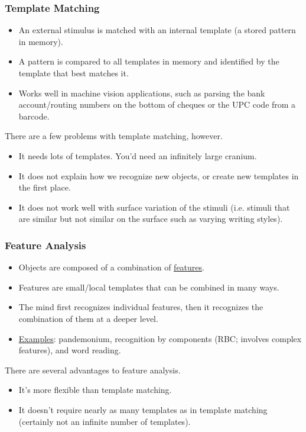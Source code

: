 \documentclass[]{article}
\begin{document}
			\subsubsection{Template Matching}
				\begin{itemize}
					\item An external stimulus is matched with an internal template (a stored pattern in memory).
					\item A pattern is compared to all templates in memory and identified by the template that best matches it.
					\item Works well in machine vision applications, such as parsing the bank account/routing numbers on the bottom of cheques or the UPC code from a barcode.
				\end{itemize}

				There are a few problems with template matching, however.
				\begin{itemize}
					\item It needs lots of templates. You'd need an infinitely large cranium.
					\item It does not explain how we recognize new objects, or create new templates in the first place.
					\item It does not work well with surface variation of the stimuli (i.e. stimuli that are similar but not similar on the surface \textendash{} such as varying writing styles).
				\end{itemize}

			\subsubsection{Feature Analysis}
				\begin{itemize}
					\item Objects are composed of a combination of \underline{features}.
					\item Features are small/local templates that can be combined in many ways.
					\item The mind first recognizes individual features, then it recognizes the combination of them at a deeper level.
					\item \underline{Examples}: pandemonium, recognition by components (RBC; involves complex features), and word reading.
				\end{itemize}
				
				There are several advantages to feature analysis.
				\begin{itemize}
					\item It's more flexible than template matching.
					\item It doesn't require nearly as many templates as in template matching (certainly not an infinite number of templates).
				\end{itemize}
\end{document}
